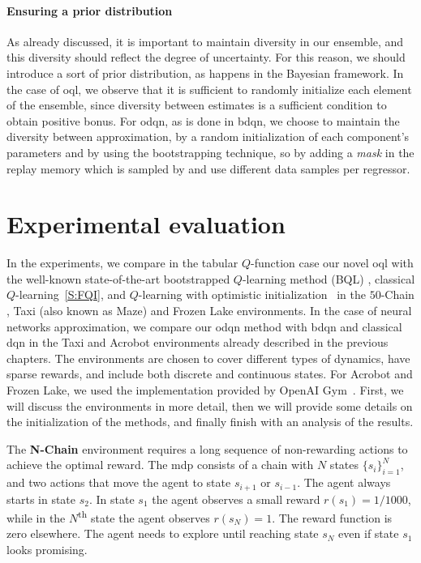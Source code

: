 \paragraph{Ensuring a prior distribution} As already discussed, it is important to maintain diversity in our ensemble, and this diversity should reflect the degree of uncertainty. For this reason, we should introduce a sort of prior distribution, as happens in the Bayesian framework. In the case of \gls{oql}, we observe that it is sufficient to randomly initialize each element of the ensemble, since diversity between estimates is a sufficient condition to obtain positive bonus.
For \gls{odqn}, as is done in \gls{bdqn}, we choose to maintain the diversity between approximation, by a random initialization of each component's parameters and by using the bootstrapping technique, so by adding a \textsl{mask} in the replay memory which is sampled by  and use different data samples per regressor.

\section{Experimental evaluation}
\label{S:odqn_experiments}
In the experiments, we compare in the tabular $Q$-function case our novel \gls{oql} with the well-known state-of-the-art bootstrapped $Q$-learning method (BQL) \cite{osband2016deep}, classical $Q$-learning~\ref{S:FQI}, and $Q$-learning with optimistic initialization~\cite{sutton1998reinforcement} in the $50$-Chain \cite{osband2016deep}, Taxi (also known as Maze) \cite{dearden1998bayesian} and Frozen Lake \cite{brockman2016openai} environments. In the case of neural networks approximation, we compare our \gls{odqn} method with \gls{bdqn} and classical \gls{dqn} in the Taxi and Acrobot environments already described in the previous chapters.
The environments are chosen to cover different types of dynamics, have sparse rewards, and include both discrete and continuous states. For Acrobot and Frozen Lake, we used the implementation provided by OpenAI Gym~\cite{brockman2016openai}. First, we will discuss the environments in more detail, then we will provide some details on the
initialization of the methods, and finally finish with an analysis of the results.

The \textbf{N-Chain} environment \cite{osband2016deep} requires a long sequence of non-rewarding actions to achieve the optimal reward. The \gls{mdp} consists of a chain with $N$ states $\{s_i\}_{i=1}^N$, and two actions that move the agent to state $s_{i+1}$ or $s_{i-1}$. The agent always starts in state $s_2$. In state $s_1$ the agent observes a small reward $r(s_1)=1/1000$, while in the $N$\textsuperscript{th} state the agent observes $r(s_N) = 1$. The reward function is zero elsewhere. The agent needs to explore until reaching state $s_N$ even if state $s_1$ looks promising.
   
